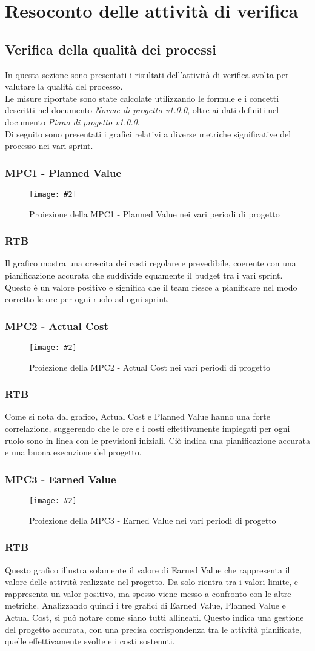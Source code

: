 \newcommand{\Met}[3]{
    \subsubsection{#1}
    \begin{figure}[h!] \centering
        \texttt{[image: \#2]}
        \caption{Proiezione della#1nei vari periodi di progetto}
    \end{figure}
    \subsubsection*{RTB}
    #3
    \newpage
}

\section{Resoconto delle attività di verifica}

\subsection{Verifica della qualità dei processi}
In questa sezione sono presentati i risultati dell'attività di verifica svolta per valutare la qualità del processo.\\
Le misure riportate sono state calcolate utilizzando le formule e i concetti descritti nel documento \textit{Norme di progetto v1.0.0}, oltre ai dati definiti nel documento \textit{Piano di progetto v1.0.0}.\\
Di seguito sono presentati i grafici relativi a diverse metriche significative del processo nei vari sprint.

\Met
{ %
    MPC1 - Planned Value
}
{ %
    template/images/PV.png
}
{ %
    Il grafico mostra una crescita dei costi regolare e prevedibile, coerente con una pianificazione accurata che suddivide equamente il budget tra i vari sprint.
    Questo è un valore positivo e significa che il team riesce a pianificare nel modo corretto le ore per ogni ruolo ad ogni sprint.
}

\Met
{ %
    MPC2 - Actual Cost
}
{ %
    template/images/AC.png
}
{ %
    Come si nota dal grafico, Actual Cost e Planned Value hanno una forte correlazione, suggerendo che le ore e i costi effettivamente impiegati per ogni ruolo sono in linea con le previsioni iniziali.
    Ciò indica una pianificazione accurata e una buona esecuzione del progetto.
}

\Met
{ %
    MPC3 - Earned Value
}
{ %
    template/images/EV.png
}
{ %
    Questo grafico illustra solamente il valore di Earned Value che rappresenta il valore delle attività realizzate nel progetto.
    Da solo rientra tra i valori limite, e rappresenta un valor positivo, ma spesso viene messo a confronto con le altre metriche.
    Analizzando quindi i tre grafici di Earned Value, Planned Value e Actual Cost, si può notare come siano tutti allineati. 
    Questo indica una gestione del progetto accurata, con una precisa corrispondenza tra le attività pianificate, quelle effettivamente svolte e i costi sostenuti.
}

